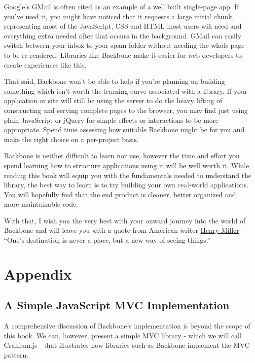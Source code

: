 \documentclass[9pt]{book}
\begin{document}
Google's GMail is often cited as an example of a well built single-page
app. If you've used it, you might have noticed that it requests a large
initial chunk, representing most of the JavaScript, CSS and HTML most
users will need and everything extra needed after that occurs in the
background. GMail can easily switch between your inbox to your spam
folder without needing the whole page to be re-rendered. Libraries like
Backbone make it easier for web developers to create experiences like
this.

That said, Backbone won't be able to help if you're planning on building
something which isn't worth the learning curve associated with a
library. If your application or site will still be using the server to
do the heavy lifting of constructing and serving complete pages to the
browser, you may find just using plain JavaScript or jQuery for simple
effects or interactions to be more appropriate. Spend time assessing how
suitable Backbone might be for you and make the right choice on a
per-project basis.

Backbone is neither difficult to learn nor use, however the time and
effort you spend learning how to structure applications using it will be
well worth it. While reading this book will equip you with the
fundamentals needed to understand the library, the best way to learn is
to try building your own real-world applications. You will hopefully
find that the end product is cleaner, better organized and more
maintainable code.

With that, I wish you the very best with your onward journey into the
world of Backbone and will leave you with a quote from American writer
\href{http://en.wikipedia.org/wiki/Henry_Miller}{Henry Miller} - ``One's
destination is never a place, but a new way of seeing things.''

\section{Appendix}\label{appendix}

\subsection{A Simple JavaScript MVC
Implementation}\label{a-simple-javascript-mvc-implementation}

A comprehensive discussion of Backbone's implementation is beyond the
scope of this book. We can, however, present a simple MVC library -
which we will call Cranium.js - that illustrates how libraries such as
Backbone implement the MVC pattern.
\end{document}

